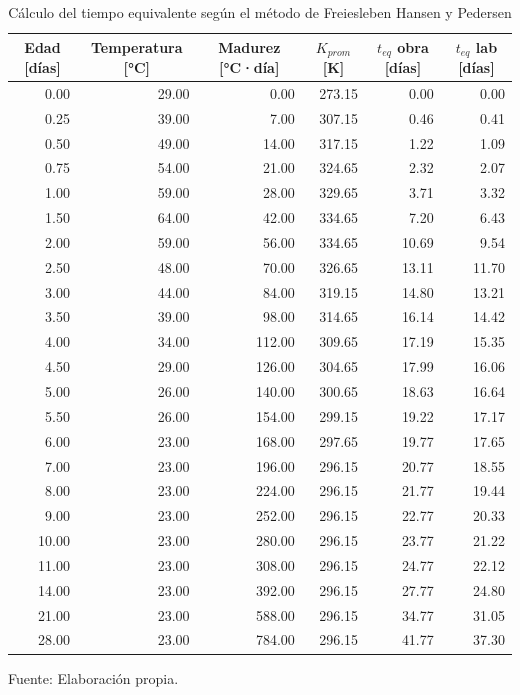 \begin{table}[H]
\centering
\renewcommand{\arraystretch}{1.15}
\caption{Cálculo del tiempo equivalente según el método de Freiesleben Hansen y Pedersen}
\begin{tabular}{r r r r r r}
\hline
\multicolumn{1}{c}{Edad [días]} & \multicolumn{1}{c}{Temperatura [°C]} & \multicolumn{1}{c}{Madurez [°C·día]} & \multicolumn{1}{c}{$K_{prom}$ [K]} & \multicolumn{1}{c}{$t_{eq}$ obra [días]} & \multicolumn{1}{c}{$t_{eq}$ lab [días]} \\
\hline
0.00 & 29.00 & 0.00 & 273.15 & 0.00 & 0.00 \\
0.25 & 39.00 & 7.00 & 307.15 & 0.46 & 0.41 \\
0.50 & 49.00 & 14.00 & 317.15 & 1.22 & 1.09 \\
0.75 & 54.00 & 21.00 & 324.65 & 2.32 & 2.07 \\
1.00 & 59.00 & 28.00 & 329.65 & 3.71 & 3.32 \\
1.50 & 64.00 & 42.00 & 334.65 & 7.20 & 6.43 \\
2.00 & 59.00 & 56.00 & 334.65 & 10.69 & 9.54 \\
2.50 & 48.00 & 70.00 & 326.65 & 13.11 & 11.70 \\
3.00 & 44.00 & 84.00 & 319.15 & 14.80 & 13.21 \\
3.50 & 39.00 & 98.00 & 314.65 & 16.14 & 14.42 \\
4.00 & 34.00 & 112.00 & 309.65 & 17.19 & 15.35 \\
4.50 & 29.00 & 126.00 & 304.65 & 17.99 & 16.06 \\
5.00 & 26.00 & 140.00 & 300.65 & 18.63 & 16.64 \\
5.50 & 26.00 & 154.00 & 299.15 & 19.22 & 17.17 \\
6.00 & 23.00 & 168.00 & 297.65 & 19.77 & 17.65 \\
7.00 & 23.00 & 196.00 & 296.15 & 20.77 & 18.55 \\
8.00 & 23.00 & 224.00 & 296.15 & 21.77 & 19.44 \\
9.00 & 23.00 & 252.00 & 296.15 & 22.77 & 20.33 \\
10.00 & 23.00 & 280.00 & 296.15 & 23.77 & 21.22 \\
11.00 & 23.00 & 308.00 & 296.15 & 24.77 & 22.12 \\
14.00 & 23.00 & 392.00 & 296.15 & 27.77 & 24.80 \\
21.00 & 23.00 & 588.00 & 296.15 & 34.77 & 31.05 \\
28.00 & 23.00 & 784.00 & 296.15 & 41.77 & 37.30 \\
\hline
\end{tabular}

Fuente: Elaboración propia.

\end{table}

